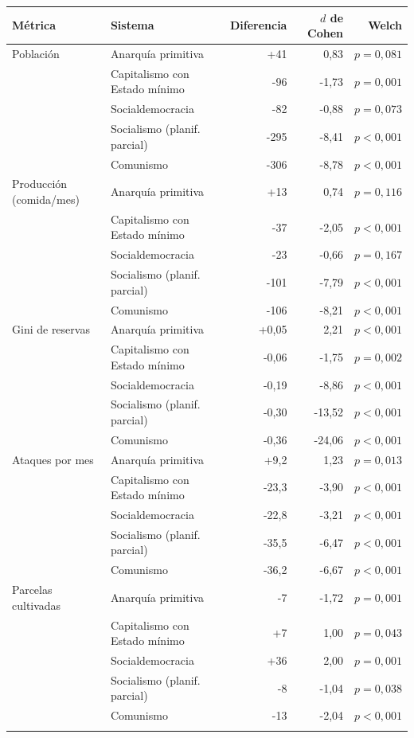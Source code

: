 \begin{tabular}{llrrr}
\toprule
Métrica & Sistema & Diferencia & $d$ de Cohen & Welch \\
\midrule
Población & Anarquía primitiva & +41 & 0,83 & $p=0{,}081$ \\
 & Capitalismo con Estado mínimo & -96 & -1,73 & $p=0{,}001$ \\
 & Socialdemocracia & -82 & -0,88 & $p=0{,}073$ \\
 & Socialismo (planif. parcial) & -295 & -8,41 & $p<0{,}001$ \\
 & Comunismo & -306 & -8,78 & $p<0{,}001$ \\
\addlinespace
Producción (comida/mes) & Anarquía primitiva & +13 & 0,74 & $p=0{,}116$ \\
 & Capitalismo con Estado mínimo & -37 & -2,05 & $p<0{,}001$ \\
 & Socialdemocracia & -23 & -0,66 & $p=0{,}167$ \\
 & Socialismo (planif. parcial) & -101 & -7,79 & $p<0{,}001$ \\
 & Comunismo & -106 & -8,21 & $p<0{,}001$ \\
\addlinespace
Gini de reservas & Anarquía primitiva & +0,05 & 2,21 & $p<0{,}001$ \\
 & Capitalismo con Estado mínimo & -0,06 & -1,75 & $p=0{,}002$ \\
 & Socialdemocracia & -0,19 & -8,86 & $p<0{,}001$ \\
 & Socialismo (planif. parcial) & -0,30 & -13,52 & $p<0{,}001$ \\
 & Comunismo & -0,36 & -24,06 & $p<0{,}001$ \\
\addlinespace
Ataques por mes & Anarquía primitiva & +9,2 & 1,23 & $p=0{,}013$ \\
 & Capitalismo con Estado mínimo & -23,3 & -3,90 & $p<0{,}001$ \\
 & Socialdemocracia & -22,8 & -3,21 & $p<0{,}001$ \\
 & Socialismo (planif. parcial) & -35,5 & -6,47 & $p<0{,}001$ \\
 & Comunismo & -36,2 & -6,67 & $p<0{,}001$ \\
\addlinespace
Parcelas cultivadas & Anarquía primitiva & -7 & -1,72 & $p=0{,}001$ \\
 & Capitalismo con Estado mínimo & +7 & 1,00 & $p=0{,}043$ \\
 & Socialdemocracia & +36 & 2,00 & $p=0{,}001$ \\
 & Socialismo (planif. parcial) & -8 & -1,04 & $p=0{,}038$ \\
 & Comunismo & -13 & -2,04 & $p<0{,}001$ \\
\addlinespace
\bottomrule
\end{tabular}
